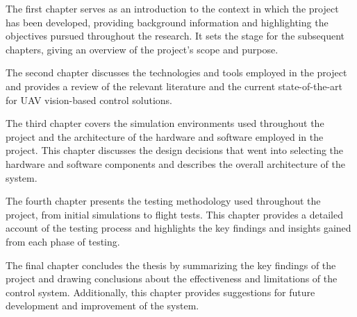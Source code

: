 The first chapter serves as an introduction to the context in which the project has been developed, providing background information and highlighting the objectives pursued throughout the research. It sets the stage for the subsequent chapters, giving an overview of the project's scope and purpose.

The second chapter discusses the technologies and tools employed in the project and provides a review of the relevant literature and the current state-of-the-art for UAV vision-based control solutions.

The third chapter covers the simulation environments used throughout the project and the architecture of the hardware and software employed in the project. This chapter discusses the design decisions that went into selecting the hardware and software components and describes the overall architecture of the system.

The fourth chapter presents the testing methodology used throughout the project, from initial simulations to flight tests. This chapter provides a detailed account of the testing process and highlights the key findings and insights gained from each phase of testing.

The final chapter concludes the thesis by summarizing the key findings of the project and drawing conclusions about the effectiveness and limitations of the control system. Additionally, this chapter provides suggestions for future development and improvement of the system.

\cleardoublepage
